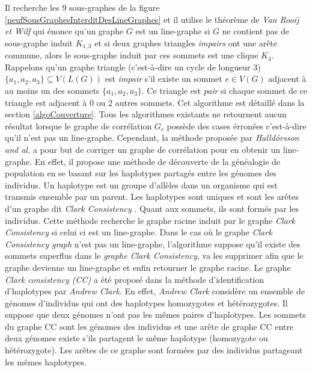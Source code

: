 Il recherche les $9$ sous-graphes de la figure \ref{neufSousGraphesInterditDesLineGraphes} et il utilise le th\'eor\`eme de {\em Van Rooij et Wilf} \cite{ROOIJetWILF1965interchange} qui \'enonce qu'un graphe $G$ est un line-graphe si $G$ ne contient pas de sous-graphe induit $K_{1,3}$ et si deux graphes triangles  {\em impairs} ont une ar\^ete commune, alors le sous-graphe induit par ces sommets est une clique $K_4$. 
Rappelons qu'un graphe triangle (c'est-\`a-dire un cycle de longueur $3$) $\{a_1,a_2,a_3\} \subseteq V(L(G))$ est {\em impair} s'il existe un sommet $e \in V(G)$ adjacent \`a  au moins un des sommets $\{a_1, a_2, a_3\}$. Ce triangle est {\em pair} si chaque sommet de ce triangle est adjacent \`a $0$ ou $2$ autres sommets. Cet algorithme est d\'etaill\'e dans la section \ref{algoCouverture}.
\newline
Tous les algorithmes existants ne retournent  aucun r\'esultat lorsque le graphe  de corr\'elation $G_c$ poss\`ede des cases \'erron\'ees c'est-\`a-dire qu'il n'est pas un line-graphe. 
Cependant, la m\'ethode propos\'ee par {\em Halld{\'o}rsson and al.} \cite{Halldorsson2013} a pour but de corriger un graphe de corr\'elation pour en obtenir un line-graphe. En effet, il propose une m\'ethode de d\'ecouverte de la g\'en\'ealogie de population en se basant sur les haplotypes partag\'es entre les g\'enomes des individus.  
Un haplotype est un groupe d'all\`eles dans un organisme qui est transmis ensemble par un parent.
Les haplotypes sont uniques et sont les ar\^etes d'un graphe dit {\em Clark Consistency} \cite{halldorsson2011clark}. Quant aux sommets, ils sont form\'es par les individus. 
Cette m\'ethode recherche le graphe racine induit par le graphe {\em Clark Consistency} si celui ci est un line-graphe. Dans le cas o\`u le graphe {\em Clark Consistency graph} n'est pas un line-graphe, l'algorithme suppose qu'il existe des sommets superflus dans le {\em graphe Clark Consistency}, va les supprimer afin que le graphe devienne un line-graphe et enfin retourner le graphe racine.     
Le graphe {\em Clark consistency (CC)} a \'et\'e propos\'e dans  la m\'ethode d'identification d'haplotypes par {\em Andrew Clark}. 
En effet, {\em Andrew Clark} consid\`ere un ensemble de g\'enomes d'individus qui ont des haplotypes homozygotes et h\'et\'erozygotes. Il suppose que deux g\'enomes n'ont pas les m\^emes paires d'haplotypes. Les sommets du graphe CC sont les g\'enomes des individus et une ar\^ete de graphe CC entre deux g\'enomes existe s'ils partagent le m\^eme haplotype (homozygote ou h\'et\'erozygote). Les ar\^etes de ce graphe sont form\'ees par des individus partageant les m\^emes haplotypes. 
